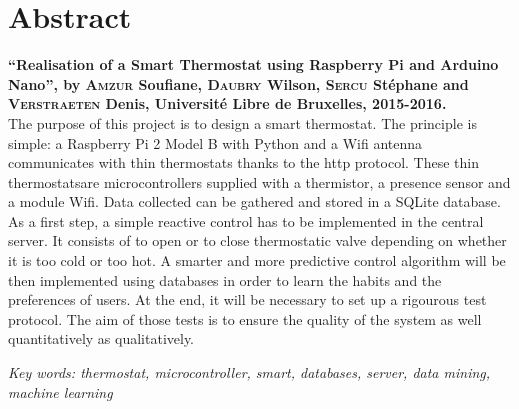 \documentclass[11pt,a4paper,11pt]{report}
\begin{document}
\chapter*{Abstract}
\textbf{“Realisation of a Smart Thermostat using Raspberry Pi and Arduino Nano”,
by \textsc{Amzur} Soufiane, \textsc{Daubry} Wilson, \textsc{Sercu} Stéphane and \textsc{Verstraeten} Denis, Université Libre de Bruxelles, 2015-2016.}
\vspace{0.2cm}\\
The purpose of this project is to design a smart thermostat. The principle is simple: a Raspberry Pi 2 Model B with Python and a Wifi antenna communicates with \og thin thermostats \fg thanks to the http protocol. These \og thin thermostats\fg are microcontrollers supplied with a thermistor, a presence sensor and a module Wifi. Data collected can be gathered and stored in a SQLite database. As a first step, a simple reactive control has to be implemented in the central server. It consists of to open or to close thermostatic valve depending on whether it is too cold or too hot. A smarter and more predictive control algorithm will be then implemented using databases in order to learn the habits and the preferences of users. At the end, it will be necessary to set up a rigourous test protocol. The aim of those tests is to ensure the quality of the system as well quantitatively as qualitatively.\newline
 
\textit{Key words:  thermostat, microcontroller, smart, databases, server, data mining, machine learning}
\newline
\end{document}
